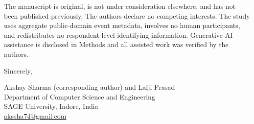 \documentclass[10pt]{article}
\begin{document}
The manuscript is original, is not under consideration elsewhere, and has not
been published previously. The authors declare no competing interests. The
study uses aggregate public-domain event metadata, involves no human
participants, and redistributes no respondent-level identifying information.
Generative-AI assistance is disclosed in Methods and all assisted work was
verified by the authors.

\medskip
Sincerely,

Akshay Sharma (corresponding author) and Lalji Prasad\\
Department of Computer Science and Engineering\\
SAGE University, Indore, India\\
\href{mailto:akssha74@gmail.com}{akssha74@gmail.com}
\end{document}
